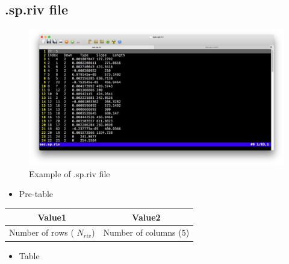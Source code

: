 \documentclass[
]{scrbook}
\providecommand{\tightlist}{%
  \setlength{\itemsep}{0pt}\setlength{\parskip}{0pt}}
\begin{document}
\hypertarget{sp.riv-file}{%
\subsection{.sp.riv file}\label{sp.riv-file}}

\begin{figure}
\centering
\includegraphics{Fig/IO/sp.riv.png}
\caption{Example of .sp.riv file}
\end{figure}

\begin{itemize}
\tightlist
\item
  Pre-table
\end{itemize}

\begin{longtable}[]{@{}cc@{}}
\toprule
Value1 & Value2\tabularnewline
\midrule
\endhead
Number of rows ( \(N_{riv}\)) & Number of columns (\(5\))\tabularnewline
\bottomrule
\end{longtable}

\begin{itemize}
\tightlist
\item
  Table
\end{itemize}
\end{document}
